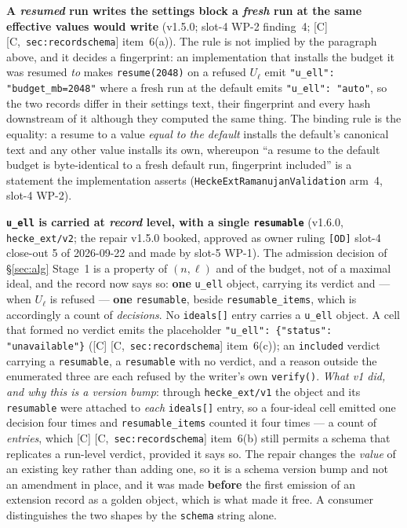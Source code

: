 \documentclass[11pt]{article}
\theoremstyle{remark}
\newcommand{\HA}[1]{[C,~\texttt{#1}]}      %
\begin{document}
\textbf{A \emph{resumed} run writes the settings block a \emph{fresh} run at the same
effective values would write} (v1.5.0; slot-4 WP-2 finding~4; [C] \HA{sec:recordschema}
item~6(a)). The rule is not implied by the paragraph above, and it decides a fingerprint:
an implementation that installs the budget it was resumed \emph{to} makes
\texttt{resume(2048)} on a refused $U_\ell$ emit
\texttt{"u\_ell": "budget\_mb=2048"} where a fresh run at the default emits
\texttt{"u\_ell": "auto"}, so the two records differ in their settings text, their
fingerprint and every hash downstream of it although they computed the same thing. The
binding rule is the equality: a resume to a value \emph{equal to the default} installs the
default's canonical text and any other value installs its own, whereupon ``a resume to the
default budget is byte-identical to a fresh default run, fingerprint included'' is a
statement the implementation asserts (\texttt{HeckeExtRamanujanValidation} arm~4, slot-4
WP-2).

\textbf{\texttt{u\_ell} is carried at \emph{record} level, with a single
\texttt{resumable}} (v1.6.0, \texttt{hecke\_ext/v2}; the repair v1.5.0 booked, approved as
owner ruling \texttt{[OD]} slot-4 close-out 5 of 2026-09-22 and made by slot-5 WP-1).
The admission decision of \S\ref{sec:alg} Stage~1 is a property of $(n,\ell)$ and of the
budget, not of a maximal ideal, and the record now says so: \textbf{one} \texttt{u\_ell}
object, carrying its verdict and --- when $U_\ell$ is refused --- \textbf{one}
\texttt{resumable}, beside \texttt{resumable\_items}, which is accordingly a count of
\emph{decisions}. No \texttt{ideals[]} entry carries a \texttt{u\_ell} object. A cell that
formed no verdict emits the placeholder \texttt{"u\_ell": \{"status": "unavailable"\}} ([C]
\HA{sec:recordschema} item~6(c)); an \texttt{included} verdict carrying a
\texttt{resumable}, a \texttt{resumable} with no verdict, and a reason outside the
enumerated three are each refused by the writer's own \texttt{verify()}.
\emph{What v1 did, and why this is a version bump}: through \texttt{hecke\_ext/v1} the
object and its \texttt{resumable} were attached to \emph{each} \texttt{ideals[]} entry, so
a four-ideal cell emitted one decision four times and \texttt{resumable\_items} counted it
four times --- a count of \emph{entries}, which [C] \HA{sec:recordschema} item~6(b) still
permits a schema that replicates a run-level verdict, provided it says so. The repair
changes the \emph{value} of an existing key rather than adding one, so it is a schema
version bump and not an amendment in place, and it was made \textbf{before} the first
emission of an extension record as a golden object, which is what made it free. A consumer
distinguishes the two shapes by the \texttt{schema} string alone.
\end{document}
